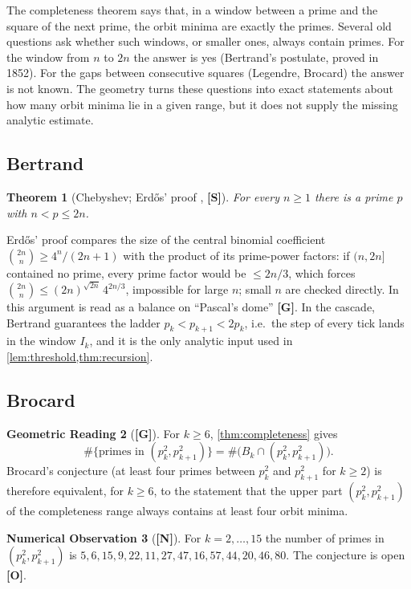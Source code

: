 \documentclass[11pt,a4paper]{article}
\newcommand{\statS}{\textsf{\textbf{[S]}}}
\newcommand{\statG}{\textsf{\textbf{[G]}}}
\newcommand{\statN}{\textsf{\textbf{[N]}}}
\newcommand{\statO}{\textsf{\textbf{[O]}}}
\theoremstyle{plain}
\newtheorem{theorem}{Theorem}[section]
\theoremstyle{definition}
\newtheorem{reading}[theorem]{Geometric Reading}
\newtheorem{observation}[theorem]{Numerical Observation}
\theoremstyle{remark}
\begin{document}
\begin{plainwords}
The completeness theorem says that, in a window between a prime and the square
of the next prime, the orbit minima are exactly the primes. Several old
questions ask whether such windows, or smaller ones, always contain primes.
For the window from $n$ to $2n$ the answer is yes (Bertrand's postulate, proved
in 1852). For the gaps between consecutive squares (Legendre, Brocard) the
answer is not known. The geometry turns these questions into exact statements
about how many orbit minima lie in a given range, but it does not supply the
missing analytic estimate.
\end{plainwords}

\subsection{Bertrand}
\begin{theorem}[Chebyshev; Erd\H{o}s' proof \cite{Erdos32}, \statS]
For every $n\ge1$ there is a prime $p$ with $n<p\le2n$.
\end{theorem}
Erd\H{o}s' proof compares the size of the central binomial coefficient
$\binom{2n}n\ge4^n/(2n+1)$ with the product of its prime-power factors: if
$(n,2n]$ contained no prime, every prime factor would be $\le2n/3$, which forces
$\binom{2n}n\le(2n)^{\sqrt{2n}}\,4^{2n/3}$, impossible for large $n$; small $n$
are checked directly. In \cite{K-bertrand} this argument is read as a balance
on ``Pascal's dome'' \statG. In the cascade, Bertrand guarantees the ladder
$p_k<p_{k+1}<2p_k$, i.e.\ the step of every tick lands in the window $I_k$,
and it is the only analytic input used in \cref{lem:threshold,thm:recursion}.

\subsection{Brocard}
\begin{reading}[\statG]\label{read:brocard}
For $k\ge6$, \cref{thm:completeness} gives
\[
\#\{\text{primes in }(p_k^2,p_{k+1}^2)\}=\#\bigl(B_k\cap(p_k^2,p_{k+1}^2)\bigr).
\]
Brocard's conjecture (at least four primes between $p_k^2$ and $p_{k+1}^2$ for
$k\ge2$) is therefore equivalent, for $k\ge6$, to the statement that the upper
part $(p_k^2,p_{k+1}^2)$ of the completeness range always contains at least four
orbit minima.
\end{reading}
\begin{observation}[\statN]
For $k=2,\dots,15$ the number of primes in $(p_k^2,p_{k+1}^2)$ is
$5,6,15,9,22,11,27,47,16,57,44,20,46,80$. The conjecture is open \statO.
\end{observation}
\end{document}
